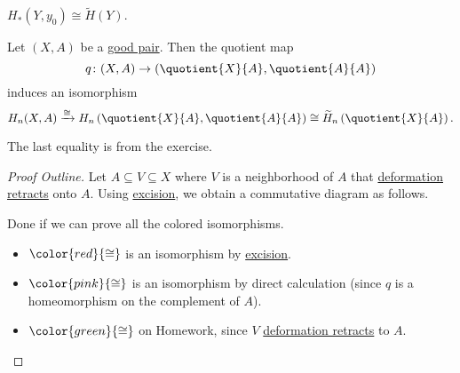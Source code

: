 \begin{exercise}
	$H_\ast(Y, y_0) \cong \widetilde{H}(Y)$.
\end{exercise}

\begin{theorem}\label{thm:good-pairs-relative-homology}
	Let $(X, A)$ be a \hyperref[def:good-pair]{good pair}. Then the quotient map
	\[
		q \colon (X, A) \to \left(\quotient{X}{A} , \quotient{A}{A} \right)
	\]
	induces an isomorphism
	\[
		H_n(X, A) \xrightarrow{\cong} H_n\left(\quotient{X}{A}, \quotient{A}{A}\right) \cong \widetilde{H}_n\left(\quotient{X}{A}\right).
	\]
\end{theorem}
\begin{remark}
	The last equality is from the exercise.
\end{remark}
\begin{proof}[Proof Outline]
	Let $A \subseteq V \subseteq X$ where $V$ is a neighborhood of $A$ that \hyperref[def:deformation-retraction]{deformation retracts} onto $A$.
	Using \hyperref[thm:excision]{excision}, we obtain a commutative diagram as follows.
	\par

	\par Done if we can prove all the colored isomorphisms.
	\begin{itemize}
		\item $\color{red}{\cong}$ is an isomorphism by \hyperref[thm:excision]{excision}.
		\item $\color{pink}{\cong}$ is an isomorphism by direct calculation (since $q$ is a homeomorphism on the complement of $A$).
		\item $\color{green}{\cong}$ on Homework, since $V$ \hyperref[def:deformation-retraction]{deformation retracts} to $A$.
	\end{itemize}
\end{proof}